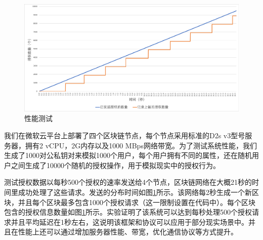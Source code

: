 \begin{figure}[H]
\centering
\includegraphics[width=12cm, keepaspectratio]{figures/performance.png}
\caption{性能测试}
\label{fig:performance}
\end{figure}

我们在微软云平台上部署了四个区块链节点，每个节点采用标准的D2s v3型号服务器，拥有2 vCPU，2G内存以及1000 MBps网络带宽。为了测试系统性能，我们生成了1000对公私钥对来模拟1000个用户，每个用户拥有不同的属性，还在随机用户之间生成了10000个随机的授权操作，用于模拟现实中的授权行为。

测试授权数据以每秒500个授权的速率发送给4个节点，区块链网络在大概21秒的时间里成功处理了这些请求。发送的分布时间如图\ref{fig:performance}所示。该网络每2秒生成一个新区块，并且每个区块最多包含1000个授权请求（这一限制设置在代码中）。每个区块包含的授权信息数量如图\ref{fig:performance}所示。实验证明了该系统可以达到每秒处理500个授权请求并且平均延迟在1秒左右，这说明该框架和协议可以应用于部分现实场景中。并且在性能上还可以通过增加服务器性能、带宽，优化通信协议等方式提升。